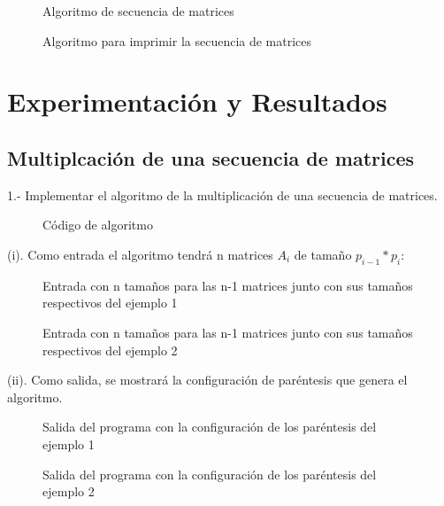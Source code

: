 \documentclass[12pt,twoside]{article}
\newcommand{\addfigure}[4]{
        \begin{figure}[htbp!]
            \begin{center}	
                \fbox{\texttt{[image: \#2]}}
                \caption{#4}
                \label{#3}
            \end{center}
        \end{figure}
  }
\begin{document}
\addfigure{.7}{img_ocho/algo1}{fig:a1}{Algoritmo de secuencia de matrices}
\addfigure{.7}{img_ocho/algo2}{fig:a2}{Algoritmo para imprimir la secuencia de matrices}
\clearpage
\section{Experimentación y Resultados}
\subsection{Multiplcación de una secuencia de matrices}
1.- Implementar el algoritmo de la multiplicación de una secuencia de matrices.\\
\addfigure{.9}{img_ocho/codigo}{fig:cod}{Código de algoritmo}
\clearpage
(i). Como entrada el algoritmo tendrá n matrices $A_{i}$ de tamaño $p_{i-1} * p_{i}$: 
\\
\addfigure{.4}{img_ocho/entradaMa}{fig:eM}{Entrada con n tamaños para las n-1 matrices junto con sus tamaños respectivos del ejemplo 1}
\addfigure{.4}{img_ocho/entradaMa2}{fig:em2}{Entrada con n tamaños para las n-1 matrices junto con sus tamaños respectivos del ejemplo 2}
(ii). Como salida, se mostrará la configuración de paréntesis que genera el algoritmo.\\

\addfigure{.6  }{img_ocho/salidaMa}{fig:SM}{Salida del programa con la configuración de los paréntesis del ejemplo 1}

\addfigure{.6  }{img_ocho/salidaMa2}{fig:SM}{Salida del programa con la configuración de los paréntesis del ejemplo 2}
\end{document}
